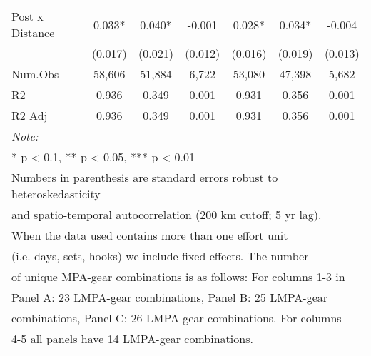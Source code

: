 \begin{table}
\begin{tabular}[t]{lcccccc}
\addlinespace[0.5cm]
\multicolumn{7}{l}{Panel C: 0-600 nautical miles}\\
\hline
\hspace{1em}Post x Distance & 0.033* & 0.040* & -0.001 & 0.028* & 0.034* & -0.004\\
\hspace{1em} & (0.017) & (0.021) & (0.012) & (0.016) & (0.019) & (0.013)\\
\hspace{1em}Num.Obs & 58,606 & 51,884 & 6,722 & 53,080 & 47,398 & 5,682\\
\hspace{1em}R2 & 0.936 & 0.349 & 0.001 & 0.931 & 0.356 & 0.001\\
\hspace{1em}R2 Adj & 0.936 & 0.349 & 0.001 & 0.931 & 0.356 & 0.001\\
\bottomrule
\multicolumn{7}{l}{\rule{0pt}{1em}\textit{Note: }}\\
\multicolumn{7}{l}{\rule{0pt}{1em}* p < 0.1, ** p < 0.05, *** p < 0.01}\\
\multicolumn{7}{l}{\rule{0pt}{1em}Numbers in parenthesis are standard errors robust to heteroskedasticity}\\
\multicolumn{7}{l}{\rule{0pt}{1em}and spatio-temporal autocorrelation (200 km cutoff; 5 yr lag).}\\
\multicolumn{7}{l}{\rule{0pt}{1em}When the data used contains more than one effort unit}\\
\multicolumn{7}{l}{\rule{0pt}{1em}(i.e. days, sets, hooks) we include fixed-effects. The number}\\
\multicolumn{7}{l}{\rule{0pt}{1em}of unique MPA-gear combinations is as follows: For columns 1-3 in}\\
\multicolumn{7}{l}{\rule{0pt}{1em}Panel A: 23 LMPA-gear combinations, Panel B: 25 LMPA-gear}\\
\multicolumn{7}{l}{\rule{0pt}{1em}combinations, Panel C: 26 LMPA-gear combinations. For columns}\\
\multicolumn{7}{l}{\rule{0pt}{1em}4-5 all panels have 14 LMPA-gear combinations.}\\
\end{tabular}
\end{table}